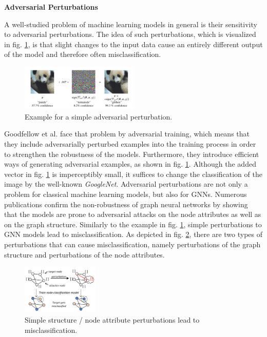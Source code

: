 \documentclass[a4paper,preprint]{sig-alternate}
\begin{document}
\textbf{Adversarial Perturbations}\newline

A well-studied problem of machine learning models in general is their sensitivity to adversarial perturbations. \cite{Goodfellow_2015}
The idea of such perturbations, which is visualized in fig. \ref{fig:adversarial_example}, is that slight changes to the input data
cause an entirely different output of the model and therefore often misclassification.

\begin{figure}[h]
    \centering
    \includegraphics[width=0.5\textwidth]{img/adversarial_example.png}
    \caption{Example for a simple adversarial perturbation. \cite{Goodfellow_2015}}
    \label{fig:adversarial_example}
\end{figure}

Goodfellow et al. \cite{Goodfellow_2015} face that problem by adversarial training, which means that they include adversarially 
perturbed examples into the training process in order to strengthen the robustness of the models. Furthermore, they introduce 
efficient ways of generating adversarial examples, as shown in fig. \ref{fig:adversarial_example}.
Although the added vector in fig. \ref{fig:adversarial_example} is imperceptibly small, it suffices to change the classification
of the image by the well-known \textit{GoogleNet}. \cite{Goodfellow_2015}\newline
Adversarial perturbations are not only a problem for classical machine learning models, but also for GNNs.
Numerous publications confirm the non-robustness of graph neural networks by showing that the models are prone to
adversarial attacks on the node attributes as well as on the graph structure. \cite{Zuegner_2019}
Similarly to the example in fig. \ref{fig:adversarial_example}, simple perturbations to GNN models lead to misclassification.
As depicted in fig. \ref{fig:adversarial_GNN}, there are two types of perturbations that can cause misclassification, 
namely perturbations of the graph structure and perturbations of the node attributes.

\begin{figure}[h]
    \centering
    \includegraphics[width=0.325\textwidth]{img/adversarial_GNN.png}
    \caption{Simple structure / node attribute perturbations lead to misclassification. \cite{Zuegner_2018}}
    \label{fig:adversarial_GNN}
\end{figure}
\end{document}

